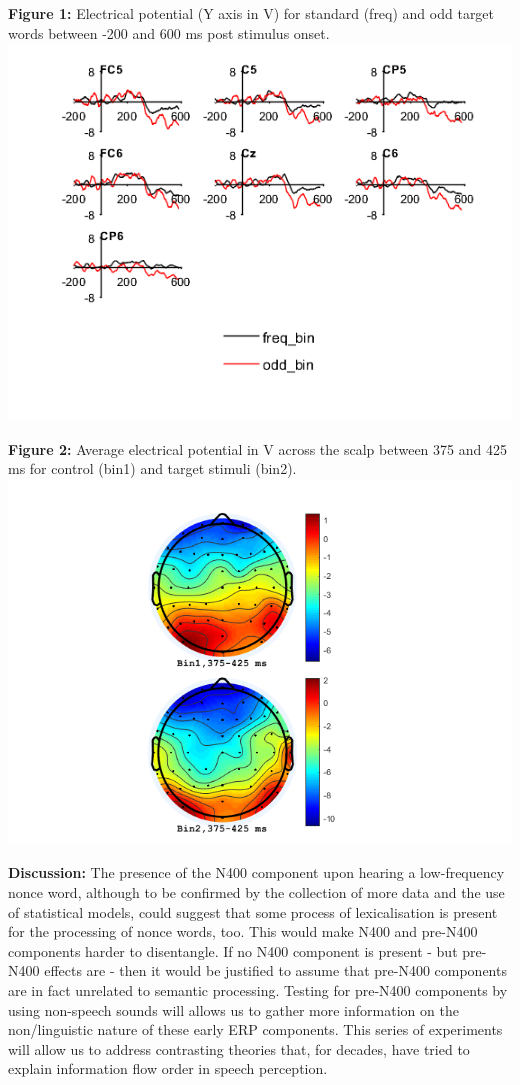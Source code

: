\documentclass[12pt,a4paper]{article}
\begin{document}
\newpage
\begin{center}
	\textbf{Figure 1:} Electrical potential (Y axis in \textmu V) for standard (freq) and odd target words between -200 and 600 ms post stimulus onset.
	\includegraphics[scale=0.75]{waveform}
	
	\textbf{Figure 2:} Average electrical potential in \textmu V across the scalp between 375 and 425 ms for control (bin1) and target stimuli (bin2).
	\includegraphics[scale=0.60]{map}
\end{center}

\textbf{Discussion:} The presence of the N400 component upon hearing a low-frequency nonce word, although to be confirmed by the collection of more data and the use of statistical models, could suggest that some process of lexicalisation is present for the processing of nonce words, too. This would make N400 and pre-N400 components harder to disentangle. If no N400 component is present - but pre-N400 effects are - then it would be justified to assume that pre-N400 components are in fact unrelated to semantic processing. Testing for pre-N400 components by using non-speech sounds will allows us to gather more information on the non/linguistic nature of these early ERP components. This series of experiments will allow us to address contrasting theories that, for decades, have tried to explain information flow order in speech perception.

\renewcommand\bibname{References} %
\end{document}
